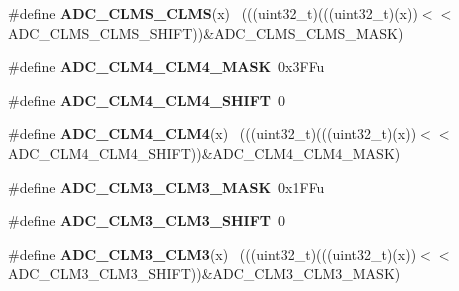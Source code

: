 \begin{DoxyCompactItemize}
\item 
\hypertarget{group___a_d_c___register___masks_ga08f7411075a5d5ba22c96f5f9027f580}{}\#define {\bfseries A\+D\+C\+\_\+\+C\+L\+M\+S\+\_\+\+C\+L\+M\+S}(x)                                              ~(((uint32\+\_\+t)(((uint32\+\_\+t)(x))$<$$<$A\+D\+C\+\_\+\+C\+L\+M\+S\+\_\+\+C\+L\+M\+S\+\_\+\+S\+H\+I\+F\+T))\&A\+D\+C\+\_\+\+C\+L\+M\+S\+\_\+\+C\+L\+M\+S\+\_\+\+M\+A\+S\+K)\label{group___a_d_c___register___masks_ga08f7411075a5d5ba22c96f5f9027f580}

\item 
\hypertarget{group___a_d_c___register___masks_ga9f8f5b63268c5b87f04ee884579a385b}{}\#define {\bfseries A\+D\+C\+\_\+\+C\+L\+M4\+\_\+\+C\+L\+M4\+\_\+\+M\+A\+S\+K}~0x3\+F\+Fu\label{group___a_d_c___register___masks_ga9f8f5b63268c5b87f04ee884579a385b}

\item 
\hypertarget{group___a_d_c___register___masks_gafa9121fc54ce9386fdc4c1d05f45d0de}{}\#define {\bfseries A\+D\+C\+\_\+\+C\+L\+M4\+\_\+\+C\+L\+M4\+\_\+\+S\+H\+I\+F\+T}~0\label{group___a_d_c___register___masks_gafa9121fc54ce9386fdc4c1d05f45d0de}

\item 
\hypertarget{group___a_d_c___register___masks_ga8fe6607d44a572792ff6df0b119716ae}{}\#define {\bfseries A\+D\+C\+\_\+\+C\+L\+M4\+\_\+\+C\+L\+M4}(x)                                              ~(((uint32\+\_\+t)(((uint32\+\_\+t)(x))$<$$<$A\+D\+C\+\_\+\+C\+L\+M4\+\_\+\+C\+L\+M4\+\_\+\+S\+H\+I\+F\+T))\&A\+D\+C\+\_\+\+C\+L\+M4\+\_\+\+C\+L\+M4\+\_\+\+M\+A\+S\+K)\label{group___a_d_c___register___masks_ga8fe6607d44a572792ff6df0b119716ae}

\item 
\hypertarget{group___a_d_c___register___masks_ga546b5a27d980deed324add231c050a6f}{}\#define {\bfseries A\+D\+C\+\_\+\+C\+L\+M3\+\_\+\+C\+L\+M3\+\_\+\+M\+A\+S\+K}~0x1\+F\+Fu\label{group___a_d_c___register___masks_ga546b5a27d980deed324add231c050a6f}

\item 
\hypertarget{group___a_d_c___register___masks_ga9bdd0a97bea9576ea5c9eccd54c08940}{}\#define {\bfseries A\+D\+C\+\_\+\+C\+L\+M3\+\_\+\+C\+L\+M3\+\_\+\+S\+H\+I\+F\+T}~0\label{group___a_d_c___register___masks_ga9bdd0a97bea9576ea5c9eccd54c08940}

\item 
\hypertarget{group___a_d_c___register___masks_ga804fa8f0631204819dad8ccb2e32acea}{}\#define {\bfseries A\+D\+C\+\_\+\+C\+L\+M3\+\_\+\+C\+L\+M3}(x)                                              ~(((uint32\+\_\+t)(((uint32\+\_\+t)(x))$<$$<$A\+D\+C\+\_\+\+C\+L\+M3\+\_\+\+C\+L\+M3\+\_\+\+S\+H\+I\+F\+T))\&A\+D\+C\+\_\+\+C\+L\+M3\+\_\+\+C\+L\+M3\+\_\+\+M\+A\+S\+K)\label{group___a_d_c___register___masks_ga804fa8f0631204819dad8ccb2e32acea}


\end{DoxyCompactItemize}
